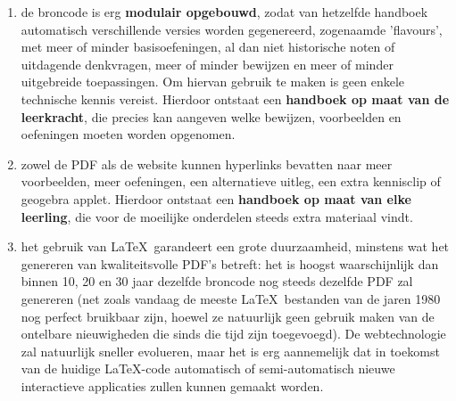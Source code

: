 \documentclass{ximera}
\begin{document}
\begin{enumerate}
        \item de broncode is erg \textbf{modulair opgebouwd}, zodat van hetzelfde handboek automatisch verschillende versies worden gegenereerd, zogenaamde 'flavours', met meer of minder basisoefeningen, al dan niet historische noten of uitdagende denkvragen, meer of minder bewijzen en meer of minder uitgebreide toepassingen. Om hiervan gebruik te maken is geen enkele technische kennis vereist. Hierdoor ontstaat een \textbf{handboek op maat van de leerkracht}, die precies kan aangeven welke bewijzen, voorbeelden en oefeningen moeten worden opgenomen.
        \item zowel de PDF als de website kunnen hyperlinks bevatten naar meer voorbeelden, meer oefeningen, een alternatieve uitleg, een extra kennisclip of geogebra applet. Hierdoor ontstaat een \textbf{handboek op maat van elke leerling}, die voor de moeilijke onderdelen steeds extra materiaal vindt.
        \item het gebruik van \LaTeX\ garandeert een grote duurzaamheid, minstens wat het genereren van kwaliteitsvolle PDF's betreft: het is hoogst waarschijnlijk dan binnen 10, 20 en 30 jaar dezelfde broncode nog steeds dezelfde PDF zal genereren (net zoals vandaag de meeste \LaTeX\ bestanden van de jaren 1980 nog perfect bruikbaar zijn, hoewel ze natuurlijk geen gebruik maken van de ontelbare nieuwigheden die sinds die tijd zijn toegevoegd). De webtechnologie zal natuurlijk sneller evolueren, maar het is erg aannemelijk dat in toekomst van de huidige \LaTeX-code automatisch of semi-automatisch nieuwe interactieve applicaties zullen kunnen gemaakt worden.
    \end{enumerate}
\end{document}
